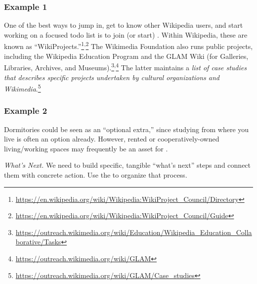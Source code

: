 \subsubsection*{Example 1}
One of the best ways to jump in, get to know other Wikipedia users,
and start working on a focused todo list is to join (or start)
.  Within Wikipedia, these are known
as
``WikiProjects.''\footnote{\url{https://en.wikipedia.org/wiki/Wikipedia:WikiProject_Council/Directory}}\textsuperscript{,}\footnote{\url{https://en.wikipedia.org/wiki/Wikipedia:WikiProject_Council/Guide}}
The Wikimedia Foundation also runs public projects, including the Wikipedia Education Program and the GLAM Wiki (for Galleries, Libraries, Archives, and Museums).\footnote{\url{https://outreach.wikimedia.org/wiki/Education/Wikipedia_Education_Collaborative/Tasks}}\textsuperscript{,}\footnote{\url{https://outreach.wikimedia.org/wiki/GLAM}}  The latter maintains a \emph{list of case studies that describes specific projects undertaken by cultural organizations and Wikimedia}.\footnote{\url{https://outreach.wikimedia.org/wiki/GLAM/Case_studies}}

\subsubsection*{Example 2}
Dormitories could be seen as an ``optional extra,'' since studying
from where you live is often an option already.  However,
rented or
cooperatively-owned living/working spaces may frequently be an asset
for .


\begin{framed}
\noindent 
\emph{What's Next.}
We need to build specific, tangible ``what's next'' steps and connect them with concrete action. Use the  to organize that process. 
\end{framed}

